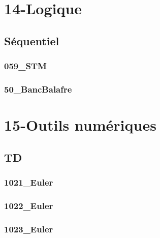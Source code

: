 \clearpage
\chapter{14-Logique}

\section{Séquentiel}

\subsection{059\_STM}
\graphicspath{{../14-Logique/TD/Séquentiel/059_STM/images/}{../14-Logique/TD/Séquentiel/059_STM/}{../Style/png/}}


\subsection{50\_BancBalafre}
\graphicspath{{../14-Logique/TD/Séquentiel/50_BancBalafre/images/}{../14-Logique/TD/Séquentiel/50_BancBalafre/}{../Style/png/}}


\clearpage
\chapter{15-Outils numériques}

\section{TD}

\subsection{1021\_Euler}
\graphicspath{{../15-Outils numériques/TD/1021_Euler/images/}{../15-Outils numériques/TD/1021_Euler/}{../Style/png/}}


\subsection{1022\_Euler}
\graphicspath{{../15-Outils numériques/TD/1022_Euler/images/}{../15-Outils numériques/TD/1022_Euler/}{../Style/png/}}


\subsection{1023\_Euler}
\graphicspath{{../15-Outils numériques/TD/1023_Euler/images/}{../15-Outils numériques/TD/1023_Euler/}{../Style/png/}}

